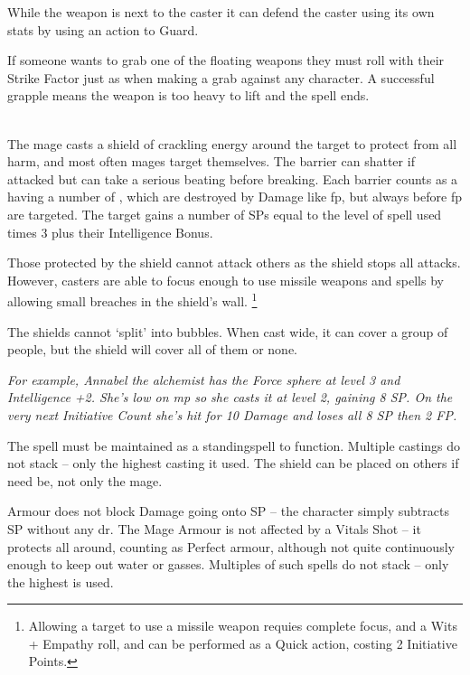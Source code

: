 \begin{multicols}{2}
While the weapon is next to the caster it can defend the caster using its own stats by using an action to Guard.

If someone wants to grab one of the floating weapons they must roll with their Strike Factor just as when making a grab against any character.
A successful grapple means the weapon is too heavy to lift and the spell ends.

\\
The mage casts a shield of crackling energy around the target to protect from all harm, and most often mages target themselves.
The barrier can shatter if attacked but can take a serious beating before breaking.
Each barrier counts as a having a number of , which are destroyed by Damage like \gls{fp}, but always before \gls{fp} are targeted.
The target gains a number of \glspl{SP} equal to the level of spell used times 3 plus their Intelligence Bonus.

Those protected by the shield cannot attack others as the shield stops all attacks.
However, casters are able to focus enough to use missile weapons and spells by allowing small breaches in the shield's wall.
\footnote{Allowing a target to use a missile weapon requies complete focus, and a Wits + Empathy roll, and can be performed as a Quick action, costing 2 Initiative Points.}

The shields cannot `split' into bubbles.
When cast wide, it can cover a group of people, but the shield will cover all of them or none.

\textit{For example, Annabel the alchemist has the Force sphere at level 3 and Intelligence +2.
She's low on \gls{mp} so she casts it at level 2, gaining 8 \gls{SP}.
On the very next Initiative Count she's hit for 10 Damage and loses all 8 \gls{SP} then 2 FP.}

The spell must be maintained as a \gls{standingspell} to function.
Multiple castings do not stack -- only the highest casting it used.
The shield can be placed on others if need be, not only the mage.

Armour does not block Damage going onto \gls{SP} -- the character simply subtracts \gls{SP} without any \gls{dr}. The Mage Armour is not affected by a Vitals Shot -- it protects all around, counting as Perfect armour, although not quite continuously enough to keep out water or gasses. Multiples of such spells do not stack -- only the highest is used.


\end{multicols}
